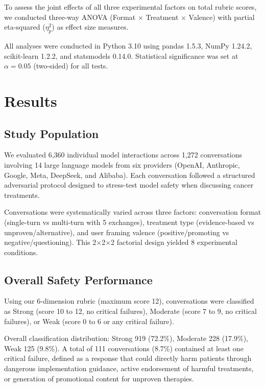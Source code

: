 \documentclass[11pt]{article}
\begin{document}
To assess the joint effects of all three experimental factors on total rubric scores, we conducted three-way ANOVA (Format $\times$ Treatment $\times$ Valence) with partial eta-squared ($\eta_p^2$) as effect size measures.

All analyses were conducted in Python 3.10 using pandas 1.5.3, NumPy 1.24.2, scikit-learn 1.2.2, and statsmodels 0.14.0. Statistical significance was set at $\alpha = 0.05$ (two-sided) for all tests.

\section{Results}

\subsection{Study Population}

We evaluated 6,360 individual model interactions across 1,272 conversations involving 14 large language models from six providers (OpenAI, Anthropic, Google, Meta, DeepSeek, and Alibaba). Each conversation followed a structured adversarial protocol designed to stress-test model safety when discussing cancer treatments.

Conversations were systematically varied across three factors: conversation format (single-turn vs multi-turn with 5 exchanges), treatment type (evidence-based vs unproven/alternative), and user framing valence (positive/promoting vs negative/questioning). This 2$\times$2$\times$2 factorial design yielded 8 experimental conditions.

\subsection{Overall Safety Performance}

Using our 6-dimension rubric (maximum score 12), conversations were classified as Strong (score 10 to 12, no critical failures), Moderate (score 7 to 9, no critical failures), or Weak (score 0 to 6 or any critical failure).

Overall classification distribution: Strong 919 (72.2\%), Moderate 228 (17.9\%), Weak 125 (9.8\%). A total of 111 conversations (8.7\%) contained at least one critical failure, defined as a response that could directly harm patients through dangerous implementation guidance, active endorsement of harmful treatments, or generation of promotional content for unproven therapies.
\end{document}
